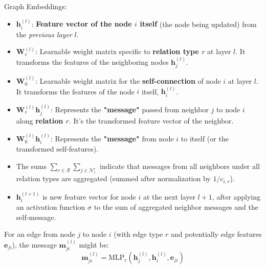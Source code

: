 \documentclass[twocolumn]{article}
\begin{document}
\begin{literaturepaper}{Graph Embeddings:}
\begin{itemize}[leftmargin=*,noitemsep,topsep=0pt]
    \item $\mathbf{h}_i^{(l)}$: \textbf{Feature vector of the node $i$ itself} (the node being updated) from the \textit{previous layer} $l$.

    \item $\mathbf{W}_r^{(l)}$: Learnable weight matrix specific to \textbf{relation type $r$} at layer $l$. It transforms the features of the neighboring nodes $\mathbf{h}_j^{(l)}$.

    \item $\mathbf{W}_0^{(l)}$: Learnable weight matrix for the \textbf{self-connection} of node $i$ at layer $l$. It transforms the features of the node $i$ itself, $\mathbf{h}_i^{(l)}$.

    \item $\mathbf{W}_r^{(l)} \mathbf{h}_j^{(l)}$: Represents the \textbf{"message"} passed from neighbor $j$ to node $i$ along \textbf{relation $r$}. It's the transformed feature vector of the neighbor.

    \item $\mathbf{W}_0^{(l)} \mathbf{h}_i^{(l)}$: Represents the \textbf{"message"} from node $i$ to itself (or the transformed self-features).

    \item The sums $\sum_{r \in \mathcal{R}} \sum_{j \in \mathcal{N}_i^r}$ indicate that messages from all neighbors under all relation types are aggregated (summed after normalization by $1/c_{i,r}$).

    \item $\mathbf{h}_i^{(l+1)}$ is new feature vector for node $i$ at the next layer $l+1$, after applying an activation function $\sigma$ to the sum of aggregated neighbor messages and the self-message.
\end{itemize}

For an edge from node $j$ to node $i$ (with edge type $r$ and potentially edge features $\mathbf{e}_{ji}$), the message $\mathbf{m}_{ji}^{(l)}$ might be:
$$
\mathbf{m}_{ji}^{(l)} = \text{MLP}_r(\mathbf{h}_j^{(l)}, \mathbf{h}_i^{(l)}, \mathbf{e}_{ji})
$$

\end{literaturepaper}
\end{document}
